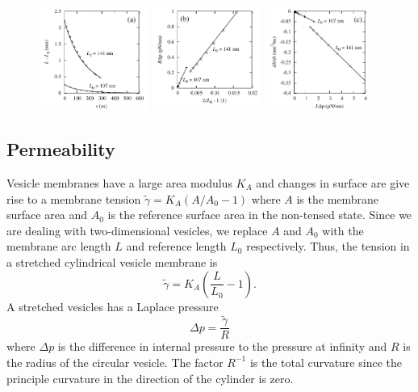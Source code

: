 \documentclass[lineno]{jfm}
\begin{document}
\begin{figure}
\centering
\includegraphics[width=0.32\textwidth]{PermPanelA.pdf}
\includegraphics[width=0.32\textwidth]{PermPanelB.pdf}
\includegraphics[width=0.32\textwidth]{PermPanelC.pdf}
  \caption{}
    \label{figure:permeability}
\end{figure}

\subsection{Permeability}
Vesicle membranes have a large area modulus $K_A$ and changes in surface are give rise to a membrane tension
$\tilde \gamma = K_A(A/A_0 - 1)$ where $A$ is the membrane surface area and $A_0$ is the reference surface area in the non-tensed state. 
Since we are dealing with two-dimensional vesicles, we replace $A$ and $A_0$ with the membrane arc length $L$ and reference length $L_0$
respectively.  Thus, the tension in a stretched cylindrical vesicle membrane is 
\begin{equation}
\label{eq:stretch}
\tilde \gamma = K_A\left(\frac{L}{L_0} - 1 \right).
\end{equation}
A stretched vesicles has a Laplace pressure 
\begin{equation}
\label{eq:LaplacePressure}
\Delta p = \frac{\tilde \gamma}{R} 
\end{equation}
where $\Delta p$ is the difference in internal pressure to the pressure at infinity
and  $R$ is the radius of the circular vesicle.  The factor 
$R^{-1}$ is the total curvature since  the principle curvature in the direction of the cylinder is zero.
\end{document}
